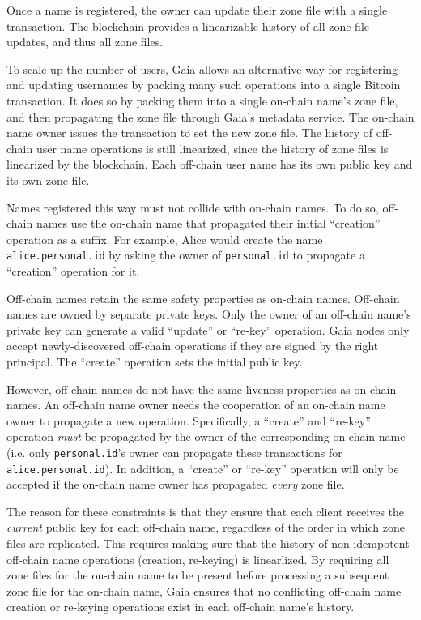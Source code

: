 Once a name is registered, the owner can update their zone file with a single
transaction.  The blockchain provides a linearizable history of all zone file
updates, and thus all zone files.

To scale up the number of users, Gaia allows an alternative way for registering
and updating usernames by packing many such operations into a single Bitcoin
transaction.  It does so by packing them into a single on-chain name's zone
file, and then propagating the zone file through Gaia's metadata service.
The on-chain name owner issues the transaction to set the new zone file.
The history of off-chain user name operations is still linearized, since the history of
zone files is linearized by the blockchain.  Each off-chain user name has its
own public key and its own zone file.

Names registered this way must not collide with on-chain names.  To do so, 
off-chain names use the on-chain name that propagated their initial
``creation'' operation as a suffix.  For example, Alice would create the name
\texttt{alice.personal.id} by asking the owner of \texttt{personal.id} to
propagate a ``creation'' operation for it.
 
Off-chain names retain the same safety properties as on-chain names.  Off-chain
names are owned by separate private keys.  Only the owner of an off-chain name's
private key can generate a valid ``update'' or ``re-key'' operation.  Gaia nodes
only accept newly-discovered off-chain operations if they are signed by the
right principal.  The ``create'' operation sets the initial public key.

However, off-chain names do not have the same liveness properties as on-chain
names.  An off-chain name owner needs the cooperation of an on-chain name owner
to propagate a new operation.  Specifically, a ``create'' and ``re-key''
operation \emph{must} be propagated by the owner of the corresponding on-chain name
(i.e. only \texttt{personal.id}'s owner can propagate these transactions for
\texttt{alice.personal.id}).  In addition, a ``create'' or ``re-key'' operation
will only be accepted if the on-chain name owner has propagated \emph{every}
zone file.

The reason for these constraints is that they ensure that each client receives
the \emph{current} public key for each off-chain name, regardless of the order
in which zone files are replicated.  This requires making sure
that the history of non-idempotent off-chain name operations (creation, re-keying) is
linearlized.  By requiring all zone files
for the on-chain name to be present before processing a subsequent zone file for
the on-chain name, Gaia ensures that no conflicting off-chain name
creation or re-keying operations exist in each off-chain name's history.

